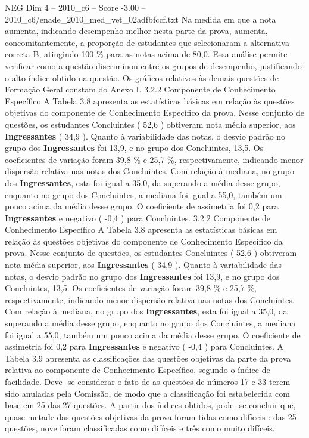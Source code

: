 \begin{textsample}{NEG Dim 4 – 2010\_c6 – Score -3.00 – 2010\_c6/enade\_2010\_med\_vet\_02adfbfccf.txt}
Na medida em que a nota aumenta, indicando desempenho melhor nesta parte da prova, aumenta, concomitantemente, a proporção de estudantes que selecionaram a alternativa correta B, atingindo 100 \% para as notas acima de 80,0.
Essa análise permite verificar como a questão discriminou entre os grupos de desempenho, justificando o alto índice obtido na questão.
Os gráficos relativos às demais questões de Formação Geral constam do Anexo I. 3.2.2 Componente de Conhecimento Específico A Tabela 3.8 apresenta as estatísticas básicas em relação às questões objetivas do componente de Conhecimento Específico da prova.
Nesse conjunto de questões, os estudantes Concluintes ( 52,6 ) obtiveram nota média superior, aos \textbf{Ingressantes} ( 34,9 ).
Quanto à variabilidade das notas, o desvio padrão no grupo dos \textbf{Ingressantes} foi 13,9, e no grupo dos Concluintes, 13,5.
Os coeficientes de variação foram 39,8 \% e 25,7 \%, respectivamente, indicando menor dispersão relativa nas notas dos Concluintes.
Com relação à mediana, no grupo dos \textbf{Ingressantes}, esta foi igual a 35,0, da superando a média desse grupo, enquanto no grupo dos Concluintes, a mediana foi igual a 55,0, também um pouco acima da média desse grupo.
O coeficiente de assimetria foi 0,2 para \textbf{Ingressantes} e negativo ( -0,4 ) para Concluintes. 3.2.2 Componente de Conhecimento Específico A Tabela 3.8 apresenta as estatísticas básicas em relação às questões objetivas do componente de Conhecimento Específico da prova.
Nesse conjunto de questões, os estudantes Concluintes ( 52,6 ) obtiveram nota média superior, aos \textbf{Ingressantes} ( 34,9 ).
Quanto à variabilidade das notas, o desvio padrão no grupo dos \textbf{Ingressantes} foi 13,9, e no grupo dos Concluintes, 13,5.
Os coeficientes de variação foram 39,8 \% e 25,7 \%, respectivamente, indicando menor dispersão relativa nas notas dos Concluintes.
Com relação à mediana, no grupo dos \textbf{Ingressantes}, esta foi igual a 35,0, da superando a média desse grupo, enquanto no grupo dos Concluintes, a mediana foi igual a 55,0, também um pouco acima da média desse grupo.
O coeficiente de assimetria foi 0,2 para \textbf{Ingressantes} e negativo ( -0,4 ) para Concluintes.
A Tabela 3.9 apresenta as classificações das questões objetivas da parte da prova relativa ao componente de Conhecimento Específico, segundo o índice de facilidade.
Deve -se considerar o fato de as questões de números 17 e 33 terem sido anuladas pela Comissão, de modo que a classificação foi estabelecida com base em 25 das 27 questões.
A partir dos índices obtidos, pode -se concluir que, quase metade das questões objetivas da prova foram tidas como difíceis : das 25 questões, nove foram classificadas como difíceis e três como muito difíceis.

\end{textsample}
